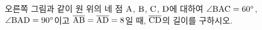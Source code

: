 \noindent\begin{minipage}[t]{0.58\linewidth}\vspace{0pt}\raggedright 오른쪽 그림과 같이 원 위의 네 점 $\mathrm{A}$, $\mathrm{B}$, $\mathrm{C}$, $\mathrm{D}$에 대하여 $\angle\mathrm{BAC}=60^\circ$, $\angle\mathrm{BAD}=90^\circ$이고 $\overline{\mathrm{AB}}=\overline{\mathrm{AD}}=8$일 때, $\overline{\mathrm{CD}}$의 길이를 구하시오.\end{minipage}\hfill\begin{minipage}[t]{0.4\linewidth}\vspace{0pt}\centering \resizebox{\ifdim\width>\linewidth\linewidth\else\width\fi}{!}{}\end{minipage}\par
